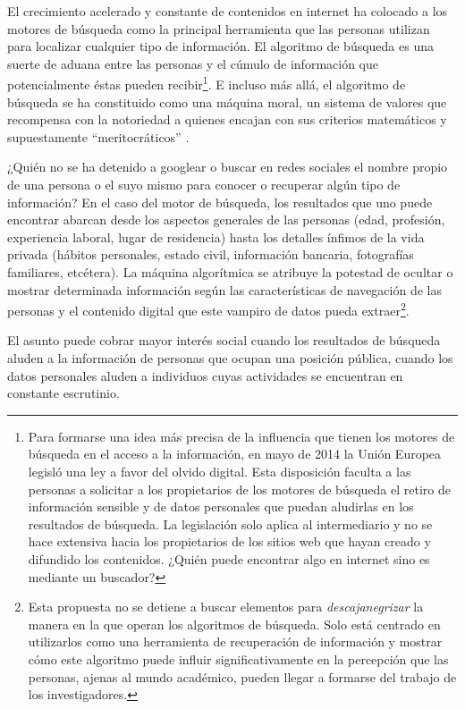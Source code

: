 \documentclass[
  spanish,
  11pt,
  a4paper,
]{scrbook}
\begin{document}
El crecimiento acelerado y constante de contenidos en internet ha
colocado a los motores de búsqueda como la principal herramienta que las
personas utilizan para localizar cualquier tipo de información. El
algoritmo de búsqueda es una suerte de aduana entre las personas y el
cúmulo de información que potencialmente éstas pueden
recibir\footnote{Para formarse una idea más precisa de la influencia que
  tienen los motores de búsqueda en el acceso a la información, en mayo
  de 2014 la Unión Europea legisló una ley a favor del olvido digital.
  Esta disposición faculta a las personas a solicitar a los propietarios
  de los motores de búsqueda el retiro de información sensible y de
  datos personales que puedan aludirlas en los resultados de búsqueda.
  La legislación solo aplica al intermediario y no se hace extensiva
  hacia los propietarios de los sitios web que hayan creado y difundido
  los contenidos. ¿Quién puede encontrar algo en internet sino es
  mediante un buscador?}. E incluso más allá, el algoritmo de búsqueda
se ha constituido como una máquina moral, un sistema de valores que
recompensa con la notoriedad a quienes encajan con sus criterios
matemáticos y supuestamente ``meritocráticos''
\autocite[63]{Cardon2013}.

¿Quién no se ha detenido a googlear o buscar en redes sociales el nombre
propio de una persona o el suyo mismo para conocer o recuperar algún
tipo de información? En el caso del motor de búsqueda, los resultados
que uno puede encontrar abarcan desde los aspectos generales de las
personas (edad, profesión, experiencia laboral, lugar de residencia)
hasta los detalles ínfimos de la vida privada (hábitos personales,
estado civil, información bancaria, fotografías familiares, etcétera).
La máquina algorítmica se atribuye la potestad de ocultar o mostrar
determinada información según las características de navegación de las
personas y el contenido digital que este vampiro de datos pueda
extraer\footnote{Esta propuesta no se detiene a buscar elementos para
  \emph{descajanegrizar} la manera en la que operan los algoritmos de
  búsqueda. Solo está centrado en utilizarlos como una herramienta de
  recuperación de información y mostrar cómo este algoritmo puede
  influir significativamente en la percepción que las personas, ajenas
  al mundo académico, pueden llegar a formarse del trabajo de los
  investigadores.}.

El asunto puede cobrar mayor interés social cuando los resultados de
búsqueda aluden a la información de personas que ocupan una posición
pública, cuando los datos personales aluden a individuos cuyas
actividades se encuentran en constante escrutinio.
\end{document}
